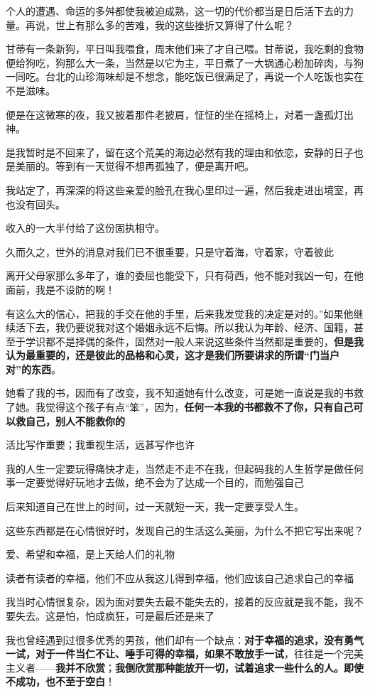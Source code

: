 \documentclass[UTF8,a4paper,8pt]{ctexbook}
\begin{document}
		个人的遭遇、命运的多舛都使我被迫成熟，这一切的代价都当是日后活下去的力量。再说，世上有那么多的苦难，我的这些挫折又算得了什么呢？
	
		甘蒂有一条新狗，平日叫我喂食，周末他们来了才自己喂。甘蒂说，我吃剩的食物便给狗吃，狗那么大一条，当然是以它为主，平日煮了一大锅通心粉加碎肉，与狗一同吃。台北的山珍海味却是不想念，能吃饭已很满足了，再说一个人吃饭也实在不是滋味。
	
		便是在这微寒的夜，我又披着那件老披肩，怔怔的坐在摇椅上，对着一盏孤灯出神。
			
		是我暂时是不回来了，留在这个荒美的海边必然有我的理由和依恋，安静的日子也是美丽的。等到有一天觉得不想再孤独了，便是离开吧。
		
		我站定了，再深深的将这些亲爱的脸孔在我心里印过一遍，然后我走进出境室，再也没有回头。
		
		收入的一大半付给了这份固执相守。
		
		久而久之，世外的消息对我们已不很重要，只是守着海，守着家，守着彼此
		
		离开父母家那么多年了，谁的委屈也能受下，只有荷西，他不能对我凶一句，在他面前，我是不设防的啊！
		
		有这么大的信心，把我的手交在他的手里，后来我发觉我的决定是对的。”如果他继续活下去，我仍要说我对这个婚姻永远不后悔。所以我认为年龄、经济、国籍，甚至于学识都不是择偶的条件，固然对一般人来说这些条件当然都是重要的，\textbf{但是我认为最重要的，还是彼此的品格和心灵，这才是我们所要讲求的所谓“门当户对”的东西}。
		
		她看了我的书，因而有了改变，我不知道她有什么改变，可是她一直说是我的书救了她。我觉得这个孩子有点“笨”，因为，\textbf{任何一本我的书都救不了你，只有自己可以救自己，别人不能救你的}
	
		活比写作重要；我重视生活，远甚写作也许
		
		我的人生一定要玩得痛快才走，当然走不走不在我，但起码我的人生哲学是做任何事一定要觉得好玩地才去做，绝不会为了达成一个目的，而勉强自己
	
		后来知道自己在世上的时间，过一天就短一天，我一定要享受人生。
		
		这些东西都是在心情很好时，发现自己的生活这么美丽，为什么不把它写出来呢？
	
		爱、希望和幸福，是上天给人们的礼物
		
		读者有读者的幸福，他们不应从我这儿得到幸福，他们应该自己追求自己的幸福
		
		我当时心情很复杂，因为面对要失去最不能失去的，接着的反应就是我不能，我不要失去。这是怕，怕成疯狂，可是最后还是来了
	
		我也曾经遇到过很多优秀的男孩，他们却有一个缺点：\textbf{对于幸福的追求，没有勇气一试，对于一件当仁不让、唾手可得的幸福，如果不敢放手一试}，往往是一个完美主义者——\textbf{我并不欣赏}；\textbf{我倒欣赏那种能放开一切，试着追求一些什么的人。即使不成功，也不至于空白}！
			
\end{document}
